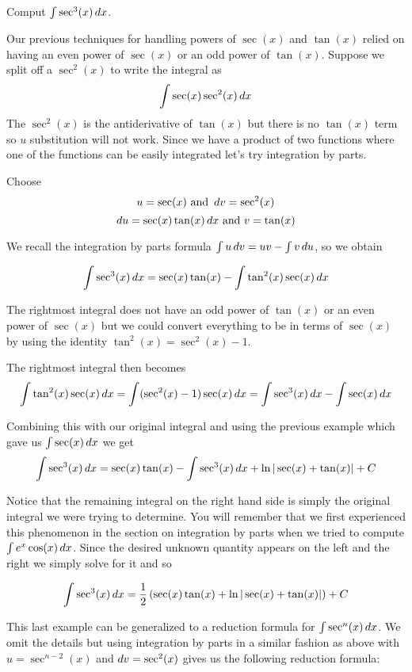\documentclass{ximera}
\begin{document}
\begin{example}
Comput $\int \sec^{3}(x) \mathop{}\!d x $.

\begin{explanation}
Our previous techniques for handling powers of $\sec(x)$ and $\tan(x)$ relied on having an even power of $\sec(x)$ or an odd power of $\tan(x)$. 
Suppose we split off a $\sec^{2}(x)$ to write the integral as 
\[
 \int \sec(x) \sec^{2}(x) \mathop{}\!d x
\]
The $\sec^{2}(x)$ is the antiderivative of $\tan(x)$ but there is no $\tan(x)$ term so $u$ substitution will not work. Since we have a product of two functions where one 
of the functions can be easily integrated let's try integration by parts. 

Choose
\[ 
u= \sec(x) \text{  and  } \mathop{}\!d v=\sec^{2}(x) \\
\] 
\[
\mathop{}\!d u=  \sec(x)\tan(x) \mathop{}\!d x \text{  and  } v=\tan(x) 
\]

We recall the integration by parts formula $\int u \mathop{}\!d v=uv-\int v \mathop{}\!d u$, so we obtain

\[
\int \sec^{3}(x) \mathop{}\!d x=\sec(x)\tan(x) - \int \tan^{2}(x)\sec(x)\mathop{}\!d x
\]

The rightmost integral does not have an odd power of $\tan(x)$ or an even power of $\sec(x)$ but we could convert 
everything to be in terms of $\sec(x)$ by using the identity $\tan^{2}(x)=\sec^{2}(x)-1$. 

The rightmost integral then becomes
\[
\int \tan^{2}(x)\sec(x) \mathop{}\!d x=\int (\sec^{2}(x)-1) \sec(x) \mathop{}\!d x= \int \sec^{3}(x)\mathop{}\!d x - \int \sec(x) \mathop{}\!d x
\]

Combining this with our original integral and using the previous example which gave us $\int \sec(x) \mathop{}\!d x$ we get
\[
\int \sec^3(x)  \mathop{}\!d x=\sec(x) \tan(x)- \int \sec^3(x)  \mathop{}\!d x + \ln| \sec(x)+\tan(x) | + C
\]

Notice that the remaining integral on the right hand side is simply the original integral we were trying to determine. You will remember that we first experienced this phenomenon in the section on integration by parts when we tried to compute $\int e^{x}\cos(x) \mathop{}\!d x$. 
Since the desired unknown quantity appears on the left and the right we simply solve for it and so

\[
\int \sec^{3}(x) \mathop{}\!d x=\frac{1}{2}\left(\sec(x) \tan(x) + \ln | \sec(x) + \tan(x)|  \right)  + C
\]
\end{explanation}
\end{example}

This last example can be generalized to a reduction formula for $\int \sec^{n}(x) \mathop{}\!d x$. We omit the details but using integration by parts in a similar fashion
as above with $u=\sec^{n-2}(x)$ and $\mathop{}\!d v=\sec^{2}(x)$ gives us the following reduction formula:
\end{document}
